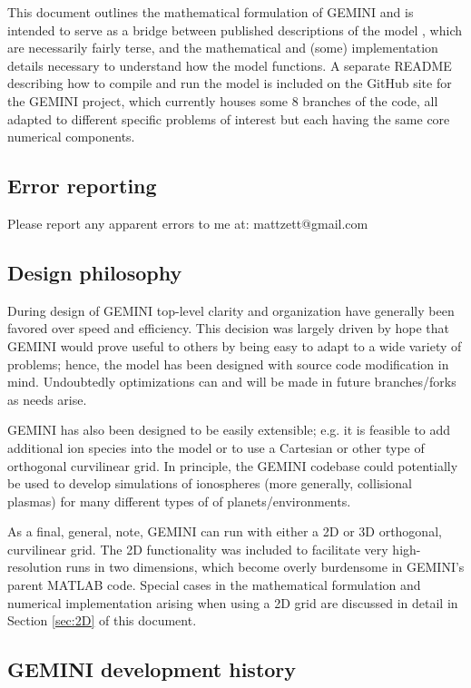 \documentclass[11pt,letterpaper]{article}
\begin{document}
This document outlines the mathematical formulation of GEMINI and is intended to serve as a bridge between published descriptions of the model \citep{Zettergren:2012,Zettergren:2014,Zettergren:2015,Zettergren:2015b}, which are necessarily fairly terse, and the mathematical and (some) implementation details necessary to understand how the model functions.  A separate README describing how to compile and run the model is included on the GitHub site for the GEMINI project, which currently houses some 8 branches of the code, all adapted to different specific problems of interest but each having the same core numerical components. 


\subsection{Error reporting}

Please report any apparent errors to me at:  mattzett@gmail.com


\subsection{Design philosophy}

During design of GEMINI top-level clarity and organization have generally been favored over speed and efficiency.  This decision was largely driven by hope that GEMINI would prove useful to others by being easy to adapt to a wide variety of problems; hence, the model has been designed with source code modification in mind.  Undoubtedly optimizations can and will be made in future branches/forks as needs arise.  

GEMINI has also been designed to be easily extensible; e.g. it is feasible to add additional ion species into the model or to use a Cartesian or other type of orthogonal curvilinear grid.  In principle, the GEMINI codebase could potentially be used to develop simulations of ionospheres (more generally, collisional plasmas) for many different types of of planets/environments.  

As a final, general, note, GEMINI can run with either a 2D or 3D orthogonal, curvilinear grid.  The 2D functionality was included to facilitate very high-resolution runs in two dimensions, which become overly burdensome in GEMINI's parent MATLAB code.  Special cases in the mathematical formulation and numerical implementation arising when using a 2D grid are discussed in detail in Section \ref{sec:2D} of this document.  


\subsection{GEMINI development history}
\end{document}
